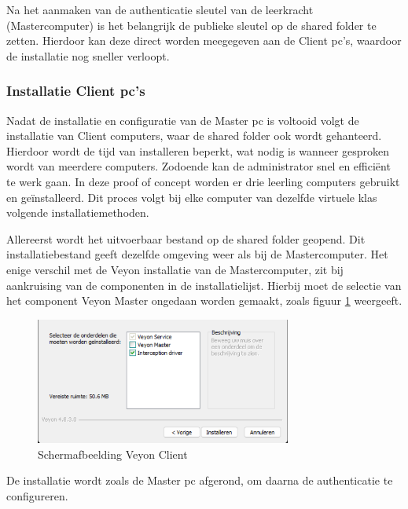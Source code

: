  Na het aanmaken van de authenticatie sleutel van de leerkracht (Mastercomputer) is het belangrijk de publieke sleutel op de shared folder te zetten. Hierdoor kan deze direct worden meegegeven aan de Client pc's, waardoor de installatie nog sneller verloopt. \newline
 
\subsubsection{Installatie Client pc's}

Nadat de installatie en configuratie van de Master pc is voltooid volgt de installatie van Client computers, waar de shared folder ook wordt gehanteerd. Hierdoor wordt de tijd van installeren beperkt, wat nodig is wanneer gesproken wordt van meerdere computers. Zodoende kan de administrator snel en efficiënt te werk gaan. In deze proof of concept worden er drie leerling computers gebruikt en geïnstalleerd. Dit proces volgt bij elke computer van dezelfde virtuele klas volgende installatiemethoden.\newline

Allereerst wordt het uitvoerbaar bestand op de shared folder geopend. Dit installatiebestand geeft dezelfde omgeving weer als bij de Mastercomputer. Het enige verschil met de Veyon installatie van de Mastercomputer, zit bij aankruising van de componenten in de installatielijst. Hierbij moet de selectie van het component Veyon Master ongedaan worden gemaakt, zoals figuur \ref{fig:Schermafbeelding Veyon Client} weergeeft.

\begin{figure}[h]
    \centering
    \includegraphics[width=0.75\textwidth]{graphics/SchermafbeeldingVeyonClient.png}
    \caption{Schermafbeelding Veyon Client}
    \label{fig:Schermafbeelding Veyon Client} 
\end{figure}
De installatie wordt zoals de Master pc afgerond, om daarna de authenticatie te configureren.\newline

